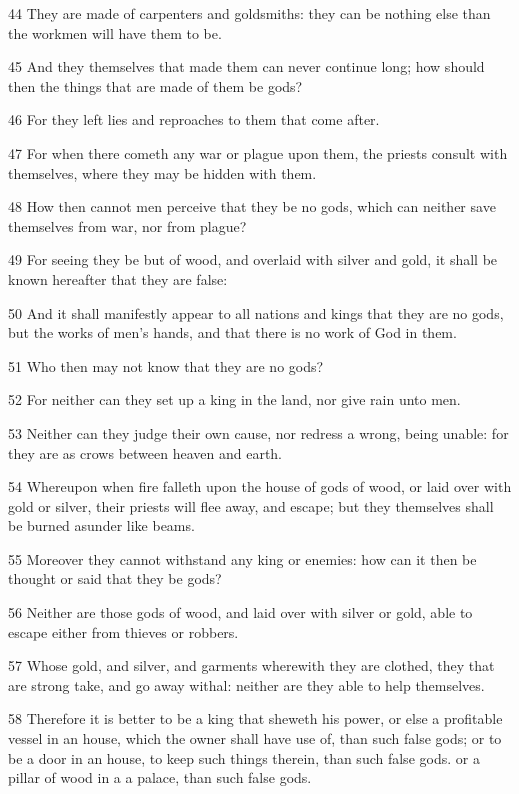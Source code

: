 \par 44 They are made of carpenters and goldsmiths: they can be nothing else than the workmen will have them to be.
\par 45 And they themselves that made them can never continue long; how should then the things that are made of them be gods?
\par 46 For they left lies and reproaches to them that come after.
\par 47 For when there cometh any war or plague upon them, the priests consult with themselves, where they may be hidden with them.
\par 48 How then cannot men perceive that they be no gods, which can neither save themselves from war, nor from plague?
\par 49 For seeing they be but of wood, and overlaid with silver and gold, it shall be known hereafter that they are false:
\par 50 And it shall manifestly appear to all nations and kings that they are no gods, but the works of men's hands, and that there is no work of God in them.
\par 51 Who then may not know that they are no gods?
\par 52 For neither can they set up a king in the land, nor give rain unto men.
\par 53 Neither can they judge their own cause, nor redress a wrong, being unable: for they are as crows between heaven and earth.
\par 54 Whereupon when fire falleth upon the house of gods of wood, or laid over with gold or silver, their priests will flee away, and escape; but they themselves shall be burned asunder like beams.
\par 55 Moreover they cannot withstand any king or enemies: how can it then be thought or said that they be gods?
\par 56 Neither are those gods of wood, and laid over with silver or gold, able to escape either from thieves or robbers.
\par 57 Whose gold, and silver, and garments wherewith they are clothed, they that are strong take, and go away withal: neither are they able to help themselves.
\par 58 Therefore it is better to be a king that sheweth his power, or else a profitable vessel in an house, which the owner shall have use of, than such false gods; or to be a door in an house, to keep such things therein, than such false gods. or a pillar of wood in a a palace, than such false gods.
